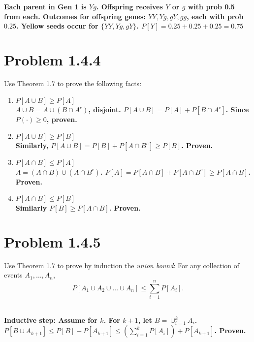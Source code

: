 \documentclass{article}
\begin{document}
{\boldmath\textbf{Each parent in Gen 1 is $Yg$. Offspring receives $Y$ or $g$ with prob 0.5 from each.
Outcomes for offspring genes: $YY, Yg, gY, gg$, each with prob $0.25$.
Yellow seeds occur for $\{YY, Yg, gY\}$.
$P[Y] = 0.25 + 0.25 + 0.25 = 0.75$}}

\newpage

\section*{Problem 1.4.4}
Use Theorem 1.7 to prove the following facts:
\begin{enumerate}[label=(\alph*)]
    \item $P[A \cup B] \ge P[A]$ \\
    {\boldmath\textbf{$A \cup B = A \cup (B \cap A^c)$, disjoint. $P[A \cup B] = P[A] + P[B \cap A^c]$. Since $P(\cdot) \ge 0$, proven.}}
    
    \item $P[A \cup B] \ge P[B]$ \\
    {\boldmath\textbf{Similarly, $P[A \cup B] = P[B] + P[A \cap B^c] \ge P[B]$. Proven.}}
    
    \item $P[A \cap B] \le P[A]$ \\
    {\boldmath\textbf{$A = (A \cap B) \cup (A \cap B^c)$. $P[A] = P[A \cap B] + P[A \cap B^c] \ge P[A \cap B]$. Proven.}}
    
    \item $P[A \cap B] \le P[B]$ \\
    {\boldmath\textbf{Similarly $P[B] \ge P[A \cap B]$. Proven.}}
\end{enumerate}

\newpage

\section*{Problem 1.4.5}
Use Theorem 1.7 to prove by induction the \textit{union bound}: For any collection of events $A_1, \dots, A_n$,
\[ P[A_1 \cup A_2 \cup \dots \cup A_n] \le \sum_{i=1}^n P[A_i]. \]

 \\
{\boldmath\textbf{Inductive step: Assume for $k$. For $k+1$, let $B = \cup_{i=1}^k A_i$. \\
$P[B \cup A_{k+1}] \le P[B] + P[A_{k+1}] \le (\sum_{i=1}^k P[A_i]) + P[A_{k+1}]$. Proven.}}
\end{document}
